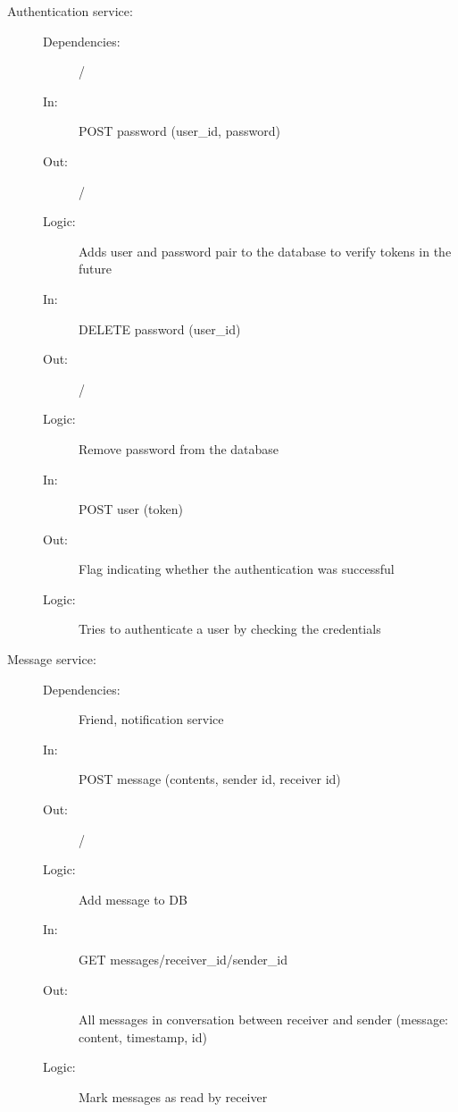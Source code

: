 \documentclass{article}
\begin{document}
\begin{description}
    \item [Authentication service:]
    \begin{description}
        \item[]
        \item[Dependencies:] /
    \end{description}
    \begin{description}
        \item[]
        \item[In:] POST password (user\_id, password)
        \item[Out:] /
        \item[Logic:] Adds user and password pair to the database to verify tokens in the future
    \end{description}
    \begin{description}
        \item[]
        \item[In:] DELETE password (user\_id)
        \item[Out:] /
        \item[Logic:] Remove password from the database
    \end{description}
    \begin{description}
        \item[]
        \item[In:] POST user (token)
        \item[Out:] Flag indicating whether the authentication was successful
        \item[Logic:] Tries to authenticate a user by checking the credentials
    \end{description}
\end{description}

\begin{description}
    \item [Message service:]
    \begin{description}
        \item[]
        \item[Dependencies:] Friend, notification service
    \end{description}
    \begin{description}
        \item[]
        \item[In:] POST message (contents, sender id, receiver id)
        \item[Out:] /
        \item[Logic:] Add message to DB
        \item[]
        
        \item[In:] GET messages/receiver\_id/sender\_id
        \item[Out:] All messages in conversation between receiver and sender (message: content, timestamp, id)
        \item[Logic:] Mark messages as read by receiver
    \end{description}
\end{description}
\end{document}
